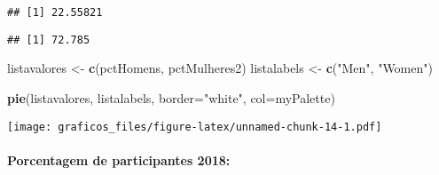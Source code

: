 \documentclass[
]{article}
\newenvironment{Shaded}{\begin{snugshade}}{\end{snugshade}}
\newcommand{\DataTypeTok}[1]{\textcolor[rgb]{0.13,0.29,0.53}{#1}}
\newcommand{\DecValTok}[1]{\textcolor[rgb]{0.00,0.00,0.81}{#1}}
\newcommand{\KeywordTok}[1]{\textcolor[rgb]{0.13,0.29,0.53}{\textbf{#1}}}
\newcommand{\NormalTok}[1]{#1}
\newcommand{\OperatorTok}[1]{\textcolor[rgb]{0.81,0.36,0.00}{\textbf{#1}}}
\newcommand{\StringTok}[1]{\textcolor[rgb]{0.31,0.60,0.02}{#1}}
\begin{document}
\begin{verbatim}
## [1] 22.55821
\end{verbatim}

\begin{Shaded}
\end{Shaded}

\begin{verbatim}
## [1] 72.785
\end{verbatim}

\begin{Shaded}
\begin{Highlighting}[]
\NormalTok{listavalores <-}\StringTok{ }\KeywordTok{c}\NormalTok{(pctHomens, pctMulheres2)}
\NormalTok{listalabels <-}\StringTok{ }\KeywordTok{c}\NormalTok{(}\StringTok{"Men"}\NormalTok{, }\StringTok{"Women"}\NormalTok{)}

\KeywordTok{pie}\NormalTok{(listavalores, listalabels, }\DataTypeTok{border=}\StringTok{"white"}\NormalTok{, }\DataTypeTok{col=}\NormalTok{myPalette)}
\end{Highlighting}
\end{Shaded}

\texttt{[image: graficos\_files/figure-latex/unnamed-chunk-14-1.pdf]}

\hypertarget{porcentagem-de-participantes-2018}{%
\paragraph{Porcentagem de participantes
2018:}\label{porcentagem-de-participantes-2018}}

\begin{Shaded}
\end{Shaded}
\end{document}
